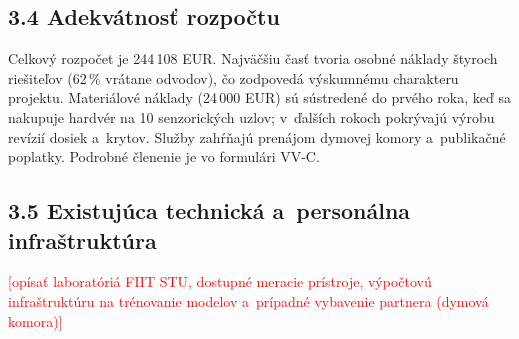 \documentclass[11pt,a4paper]{article}
\newcommand{\doplnit}[1]{\textcolor{red}{[#1]}}
\begin{document}
\subsection*{3.4 Adekvátnosť rozpočtu}
Celkový rozpočet je 244\,108 EUR. Najväčšiu časť tvoria osobné náklady štyroch riešiteľov (62\,\% vrátane odvodov), čo zodpovedá výskumnému charakteru projektu. Materiálové náklady (24\,000 EUR) sú sústredené do prvého roka, keď sa nakupuje hardvér na 10 senzorických uzlov; v~ďalších rokoch pokrývajú výrobu revízií dosiek a~krytov. Služby zahŕňajú prenájom dymovej komory a~publikačné poplatky. Podrobné členenie je vo formulári VV-C.

\subsection*{3.5 Existujúca technická a~personálna infraštruktúra}
\doplnit{opísať laboratóriá FIIT STU, dostupné meracie prístroje, výpočtovú infraštruktúru na trénovanie modelov a~prípadné vybavenie partnera (dymová komora)}
\end{document}
